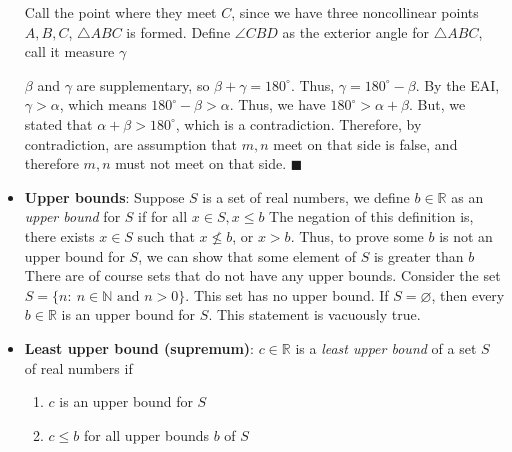 \documentclass{report}
\begin{document}
\begin{itemize}
            \bigbreak \noindent 
            \begin{figure}[ht]
                \centering
                \label{fig:p2}
            \end{figure}
            \bigbreak \noindent 
            Call the point where they meet $C$, since we have three noncollinear points $A,B,C$, $\triangle ABC$ is formed.
            \bigbreak \noindent 
            Define $\angle CBD$ as the exterior angle for $\triangle ABC$, call it measure $\gamma$
            \bigbreak \noindent 
            \begin{figure}[ht]
                \centering
                \label{fig:p4}
            \end{figure}
            \bigbreak \noindent 
            $\beta$ and $\gamma$ are supplementary, so $\beta + \gamma = 180^{\circ}$. Thus, $\gamma = 180^{\circ} - \beta$. By the EAI, $\gamma > \alpha$, which means $180^{\circ} - \beta > \alpha$. Thus, we have $180^{\circ} > \alpha + \beta$. But, we stated that $\alpha + \beta > 180^{\circ}$, which is a contradiction. 
            \bigbreak \noindent 
            Therefore, by contradiction, are assumption that $m,n$ meet on that side is false, and therefore $m,n$ must not meet on that side.  \hspace*{\fill} $\blacksquare$
            \bigbreak \noindent
        \item \textbf{Upper bounds}: Suppose $S$ is a set of real numbers, we define $b \in \mathbb{R}$ as an \textit{upper bound} for $S$ if for all $x\in S, x \leq b$
            \bigbreak \noindent 
            The negation of this definition is, there exists $x\in S$ such that $x \nleq b$, or $x > b$. Thus, to prove some $b$ is not an upper bound for $S$, we can show that some element of $S$ is greater than $b$
            \bigbreak \noindent 
            There are of course  sets that do not have any upper bounds. Consider the set $S = \{n:\ n\in \mathbb{N} \text{ and } n>0\} $. This set has no upper bound.
            \bigbreak \noindent 
            If $S = \varnothing$, then every $b \in \mathbb{R}$ is an upper bound for $S$. This statement is vacuously true.
        \item \textbf{Least upper bound (supremum)}: $c\in \mathbb{R}$ is a \textit{least upper bound} of a set $S$ of real numbers if 
            \begin{enumerate}
                \item $c$ is an upper bound for $S$
                \item $c \leq b$ for all upper bounds $b$ of $S$

\end{enumerate}
\end{itemize}
\end{document}
